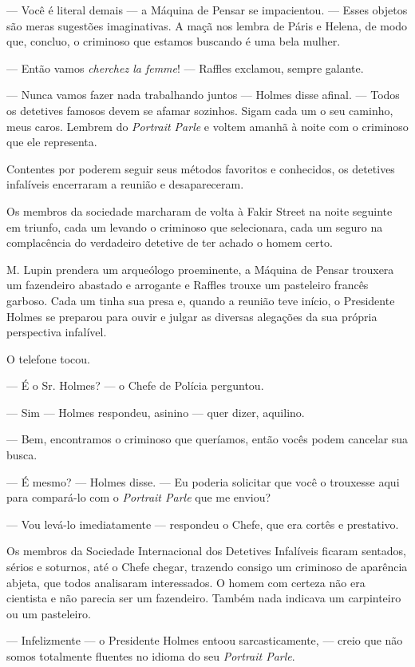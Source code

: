 --- Você é literal demais --- a Máquina de Pensar se impacientou. ---
Esses objetos são meras sugestões imaginativas. A maçã nos lembra de
Páris e Helena, de modo que, concluo, o criminoso que estamos buscando é
uma bela mulher.

--- Então vamos \emph{cherchez la femme}! --- Raffles exclamou, sempre
galante.

--- Nunca vamos fazer nada trabalhando juntos --- Holmes disse afinal.
--- Todos os detetives famosos devem se afamar sozinhos. Sigam cada um o
seu caminho, meus caros. Lembrem do \emph{Portrait Parle} e voltem
amanhã à noite com o criminoso que ele representa.

Contentes por poderem seguir seus métodos favoritos e conhecidos, os
detetives infalíveis encerraram a reunião e desapareceram.

Os membros da sociedade marcharam de volta à Fakir Street na noite
seguinte em triunfo, cada um levando o criminoso que selecionara, cada
um seguro na complacência do verdadeiro detetive de ter achado o homem
certo.

M. Lupin prendera um arqueólogo proeminente, a Máquina de Pensar
trouxera um fazendeiro abastado e arrogante e Raffles trouxe um
pasteleiro francês garboso. Cada um tinha sua presa e, quando a reunião
teve início, o Presidente Holmes se preparou para ouvir e julgar as
diversas alegações da sua própria perspectiva infalível.

O telefone tocou.

--- É o Sr. Holmes? --- o Chefe de Polícia perguntou.

--- Sim --- Holmes respondeu, asinino --- quer dizer, aquilino.

--- Bem, encontramos o criminoso que queríamos, então vocês podem
cancelar sua busca.

--- É mesmo? --- Holmes disse. --- Eu poderia solicitar que você o
trouxesse aqui para compará-lo com o \emph{Portrait Parle} que me
enviou?

--- Vou levá-lo imediatamente --- respondeu o Chefe, que era cortês e
prestativo.

Os membros da Sociedade Internacional dos Detetives Infalíveis ficaram
sentados, sérios e soturnos, até o Chefe chegar, trazendo consigo um
criminoso de aparência abjeta, que todos analisaram interessados. O
homem com certeza não era cientista e não parecia ser um fazendeiro.
Também nada indicava um carpinteiro ou um pasteleiro.

--- Infelizmente --- o Presidente Holmes entoou sarcasticamente, ---
creio que não somos totalmente fluentes no idioma do seu \emph{Portrait
Parle}.

